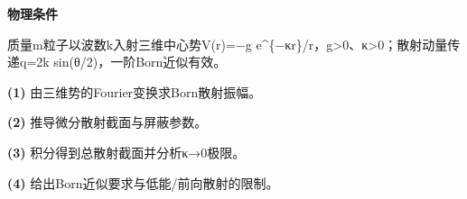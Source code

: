 \textbf{物理条件}\par 质量m粒子以波数k入射三维中心势V(r)=−g e\textasciicircum{}\{−κr\}/r，g>0、κ>0；散射动量传递q=2k sin(θ/2)，一阶Born近似有效。
\par\noindent\textbf{(1)} 由三维势的Fourier变换求Born散射振幅。
\par\noindent\textbf{(2)} 推导微分散射截面与屏蔽参数。
\par\noindent\textbf{(3)} 积分得到总散射截面并分析κ→0极限。
\par\noindent\textbf{(4)} 给出Born近似要求与低能/前向散射的限制。
